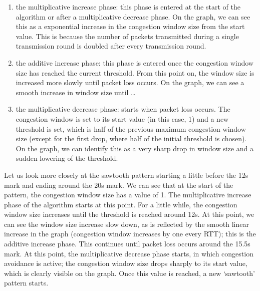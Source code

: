 \documentclass[10pt,a4paper]{article}
\begin{document}
\begin{enumerate}
\item the multiplicative increase phase: this phase is entered at the
start of the algorithm or after a multiplicative decrease phase. On
the graph, we can see this as a exponential increase in the congestion
window size from the start value. This is because the number of
packets transmitted during a single transmission round is doubled
after every transmission round.
\item the additive increase phase: this phase is entered once the
congestion window size has reached the current threshold. From this
point on, the window size is increased more slowly until packet loss
occurs. On the graph, we can see a smooth increase in window size
until \ldots
\item the multiplicative decrease phase: starts when packet loss
occurs. The congestion window is set to its start value (in this case,
1) and a new threshold is set, which is half of the previous maximum
congestion window size (except for the first drop, where half of the
initial threshold is chosen). On the graph, we can identify this as a
very sharp drop in window size and a sudden lowering of the threshold.
\end{enumerate}

Let us look more closely at the sawtooth pattern starting a little
before the 12s mark and ending around the 20s mark. We can see that at
the start of the pattern, the congestion window size has a value of
1. The multiplicative increase phase of the algorithm starts at this
point. For a little while, the congestion window size increases until
the threshold is reached around 12s. At this point, we can see the
window size increase slow down, as is reflected by the smooth linear
increase in the graph (congestion window increases by one every RTT);
this is the additive increase phase. This continues until packet loss
occurs around the 15.5s mark. At this point, the multiplicative
decrease phase starts, in which congestion avoidance is active; the
congestion window size drops sharply to its start value, which is
clearly visible on the graph. Once this value is reached, a new
`sawtooth' pattern starts.
\end{document}
